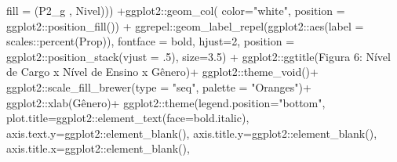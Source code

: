 \documentclass[
]{article}
\newenvironment{Shaded}{\begin{snugshade}}{\end{snugshade}}
\newcommand{\AttributeTok}[1]{\textcolor[rgb]{0.77,0.63,0.00}{#1}}
\newcommand{\DecValTok}[1]{\textcolor[rgb]{0.00,0.00,0.81}{#1}}
\newcommand{\FloatTok}[1]{\textcolor[rgb]{0.00,0.00,0.81}{#1}}
\newcommand{\FunctionTok}[1]{\textcolor[rgb]{0.00,0.00,0.00}{#1}}
\newcommand{\NormalTok}[1]{#1}
\newcommand{\SpecialCharTok}[1]{\textcolor[rgb]{0.00,0.00,0.00}{#1}}
\newcommand{\StringTok}[1]{\textcolor[rgb]{0.31,0.60,0.02}{#1}}
\begin{document}
\begin{Shaded}
\begin{Highlighting}[]
                      \AttributeTok{fill =} \StringTok{\textasciigrave{}}\AttributeTok{(\textquotesingle{}P2\_g \textquotesingle{}, \textquotesingle{}Nivel\textquotesingle{})}\StringTok{\textasciigrave{}}\NormalTok{)) }\SpecialCharTok{+}\NormalTok{ggplot2}\SpecialCharTok{::}\FunctionTok{geom\_col}\NormalTok{(}
                        \AttributeTok{color=}\StringTok{"white"}\NormalTok{, }\AttributeTok{position =}\NormalTok{ ggplot2}\SpecialCharTok{::}\FunctionTok{position\_fill}\NormalTok{()) }\SpecialCharTok{+}
\NormalTok{ggrepel}\SpecialCharTok{::}\FunctionTok{geom\_label\_repel}\NormalTok{(ggplot2}\SpecialCharTok{::}\FunctionTok{aes}\NormalTok{(}\AttributeTok{label =}\NormalTok{ scales}\SpecialCharTok{::}\FunctionTok{percent}\NormalTok{(Prop)),}
                          \AttributeTok{fontface =} \StringTok{\textquotesingle{}bold\textquotesingle{}}\NormalTok{, }\AttributeTok{hjust=}\DecValTok{2}\NormalTok{,}
                          \AttributeTok{position =}\NormalTok{ ggplot2}\SpecialCharTok{::}\FunctionTok{position\_stack}\NormalTok{(}\AttributeTok{vjust =}\NormalTok{ .}\DecValTok{5}\NormalTok{),}
                          \AttributeTok{size=}\FloatTok{3.5}\NormalTok{) }\SpecialCharTok{+}
\NormalTok{  ggplot2}\SpecialCharTok{::}\FunctionTok{ggtitle}\NormalTok{(}\StringTok{\textquotesingle{}Figura 6: Nível de Cargo x Nível de Ensino x Gênero\textquotesingle{}}\NormalTok{)}\SpecialCharTok{+}
\NormalTok{  ggplot2}\SpecialCharTok{::}\FunctionTok{theme\_void}\NormalTok{()}\SpecialCharTok{+}
\NormalTok{  ggplot2}\SpecialCharTok{::}\FunctionTok{scale\_fill\_brewer}\NormalTok{(}\AttributeTok{type =} \StringTok{"seq"}\NormalTok{, }\AttributeTok{palette =} \StringTok{"Oranges"}\NormalTok{)}\SpecialCharTok{+}
\NormalTok{  ggplot2}\SpecialCharTok{::}\FunctionTok{xlab}\NormalTok{(}\StringTok{\textquotesingle{}Gênero\textquotesingle{}}\NormalTok{)}\SpecialCharTok{+}
\NormalTok{  ggplot2}\SpecialCharTok{::}\FunctionTok{theme}\NormalTok{(}\AttributeTok{legend.position=}\StringTok{"bottom"}\NormalTok{,}
                 \AttributeTok{plot.title=}\NormalTok{ggplot2}\SpecialCharTok{::}\FunctionTok{element\_text}\NormalTok{(}\AttributeTok{face=}\StringTok{\textquotesingle{}bold.italic\textquotesingle{}}\NormalTok{),}
                 \AttributeTok{axis.text.y=}\NormalTok{ggplot2}\SpecialCharTok{::}\FunctionTok{element\_blank}\NormalTok{(),}
                 \AttributeTok{axis.title.y=}\NormalTok{ggplot2}\SpecialCharTok{::}\FunctionTok{element\_blank}\NormalTok{(),}
                 \AttributeTok{axis.title.x=}\NormalTok{ggplot2}\SpecialCharTok{::}\FunctionTok{element\_blank}\NormalTok{(),}

\end{Highlighting}
\end{Shaded}
\end{document}

